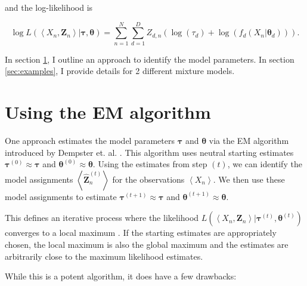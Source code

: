   and the log-likelihood is

  \begin{equation}
  \label{eq:loglikelihood}
    \log L \left( \left< X_n, \bm{Z}_n \right> |
                 \bm{\tau}, \bm{\theta} \right) =
        \sum_{n=1}^{N} \sum_{d=1}^{D}
          Z_{d,n} \left( \log(\tau_d) + \log(f_d(X_n | \bm{\theta}_d)) \right) .
  \end{equation}

  In section \ref{sec:using_em}, I outline an approach to identify the model
  parameters. In section \ref{sec:examples}, I provide details for 2 different
  mixture models.

\section{Using the EM algorithm}
\label{sec:using_em}
  One approach estimates the model parameters $\bm{\tau}$ and $\bm{\theta}$ via
  the EM algorithm introduced by Dempster et. al.
  \cite{dempster1977maximum}. This algorithm uses neutral starting estimates
  $\bm{\tau}^{(0)} \approx \bm{\tau}$ and $\bm{\theta}^{(0)} \approx
  \bm{\theta}$. Using the estimates from step $(t)$, we can identify the model
  assignments $\left< \hat{\bm{Z}}_n^{(t)} \right>$ for the observations $\left<
  X_n \right>$. We then use these model assignments to estimate $\bm{\tau}^{(t +
  1)} \approx \bm{\tau}$ and $\bm{\theta}^{(t + 1)}
  \approx \bm{\theta}$.

  This defines an iterative process where the likelihood $L(\left< X_n, \bm{Z}_n
  \right> | \bm{\tau}^{(t)}, \bm{\theta}^{(t)})$ converges to a local maximum
  \cite{wu1983convergence}. If the starting estimates are appropriately chosen,
  the local maximum is also the global maximum and the estimates are arbitrarily
  close to the maximum likelihood estimates.

  While this is a potent algorithm, it does have a few drawbacks:

